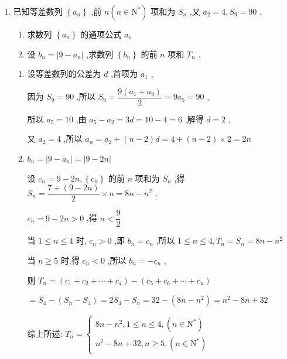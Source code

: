 \begin{enumerate}
    \item 已知等差数列 $\left\{  {a}_{n}\right\}$ ,前 $n\left( {n \in  {\mathrm{N}}^{ * }}\right)$ 项和为 ${S}_{n}$ ,又 ${a}_{2} = 4,{S}_{9} = {90}$ .
    \begin{enumerate}
        \item 求数列 $\left\{  {a}_{n}\right\}$ 的通项公式 ${a}_{n}$
        \item 设 ${b}_{n} = \left| {9 - {a}_{n}}\right|$ ,求数列 $\left\{  {b}_{n}\right\}$ 的前 $n$ 项和 ${T}_{n}$ .
    \end{enumerate}

    \begin{jieda}
        \begin{enumerate}
            \item 设等差数列的公差为 $d$ ,首项为 ${a}_{1}$ ,
            
            因为 ${S}_{9} = {90}$ ,所以 ${S}_{9} = \dfrac{9\left( {{a}_{1} + {a}_{9}}\right) }{2} = 9{a}_{5} = {90}$ ,
            
            所以 ${a}_{5} = {10}$ ,由 ${a}_{5} - {a}_{2} = {3d} = {10} - 4 = 6$ ,解得 $d = 2$ ,
            
            又 ${a}_{2} = 4$ ,所以 ${a}_{n} = {a}_{2} + \left( {n - 2}\right) d = 4 + \left( {n - 2}\right)  \times  2 = {2n}$
            \item ${b}_{n} = \left| {9 - {a}_{n}}\right|  = \left| {9 - {2n}}\right|$
            
            设 ${c}_{n} = 9 - {2n},\left\{  {c}_{n}\right\}$ 的前 $n$ 项和为 ${S}_{n}$ ,得 ${S}_{n} = \dfrac{7 + \left( {9 - {2n}}\right) }{2} \times  n = {8n} - {n}^{2}$ ,
            
            ${c}_{n} = 9 - {2n} > 0$ ,得 $n < \dfrac{9}{2}$
            
            当 $1 \leq  n \leq  4$ 时, ${c}_{n} > 0$ ,即 ${b}_{n} = {c}_{n}$ ,所以 $1 \leq  n \leq  4,{T}_{n} = {S}_{n} = {8n} - {n}^{2}$
            
            当 $n \geq  5$ 时,得 ${c}_{n} < 0$ ,所以 ${b}_{n} =  - {c}_{n}$ ,
            
            则 ${T}_{n} = \left( {{c}_{1} + {c}_{2} + \cdots  + {c}_{4}}\right)  - \left( {{c}_{5} + {c}_{6} + \cdots  + {c}_{n}}\right)$
            
            $= {S}_{4} - \left( {{S}_{n} - {S}_{4}}\right)  = 2{S}_{4} - {S}_{n} = {32} - \left( {{8n} - {n}^{2}}\right)  = {n}^{2} - {8n} + {32}$
            
            综上所述: ${T}_{n} = \left\{  \begin{array}{l} {8n} - {n}^{2},1 \leq  n \leq  4,\left( {n \in  {\mathrm{N}}^{ * }}\right) \\  {n}^{2} - {8n} + {32},n \geq  5,\left( {n \in  {\mathrm{N}}^{ * }}\right)  \end{array}\right.$
        \end{enumerate}
    \end{jieda}


\end{enumerate}
